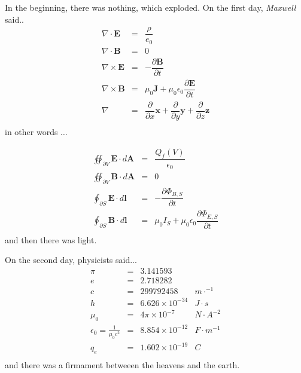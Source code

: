 \documentclass[a4paper,12pt]{article}
\begin{document}
\begin{multicols}{2}
In the beginning, there was nothing, which exploded.
\vfill
On the first day, \emph{Maxwell} said..
\[
\begin{array}{rcl}
\nabla \cdot \textbf{E} &=& \dfrac{\rho}{e_0}\\
\nabla \cdot \textbf{B} &=& 0 \\ 
\nabla \times \textbf{E} &=& -\dfrac{\partial \textbf{B}}{\partial t}\\
\nabla \times \textbf{B} &=& \mu_0 \textbf{J} + \mu_0\epsilon_0 \dfrac{\partial
\textbf{E}}{\partial t}\\ 
\nabla &=& \dfrac{\partial}{\partial x}\textbf{x} +\dfrac{\partial} {\partial y}
\textbf{y}+\dfrac{\partial}{\partial z}\textbf{z}\\
\end{array}
\]
in other words $\ldots$

\[
\begin{array}{rcl}
\oiint_{\partial V}\textbf{E} \cdot d\textbf{A} &=& \dfrac{Q_f(V)}{\epsilon_0}\\
\oiint_{\partial V}\textbf{B} \cdot d\textbf{A} &=& 0\\
\oint_{\partial S}\textbf{E} \cdot d\textbf{l} &=& -\dfrac{\partial
\Phi_{B,S}}{\partial t}\\ 
\oint_{\partial S}\textbf{B} \cdot d\textbf{l} &=& \mu_0I_S + \mu_0 \epsilon_0
\dfrac{ \partial \Phi_{E,S}}{\partial t}\\

\end{array}
\]
and then there was light.

\vfill

On the second day, physicists said...
\[
\begin{array}{rcll}
\pi &=& 3.141593 &\\
e &=& 2.718282 &\\
c &=& 299 792 458 & m\cdot^{-1}\\
h &=& 6.626 \times 10^{-34} & J\cdot s\\
\mu_0 &=& 4\pi \times 10^{-7}&N\cdot A^{-2}\\
\epsilon_0 = \frac{1}{\mu_0 c^2}&=& 8.854 \times 10^{-12}& F\cdot m^{-1}\\
q_e &=& 1.602 \times 10^{-19} & C\\
\end{array}
\]
and there was a firmament betweeen the heavens and the earth.
\vfill


\end{multicols}
\end{document}
